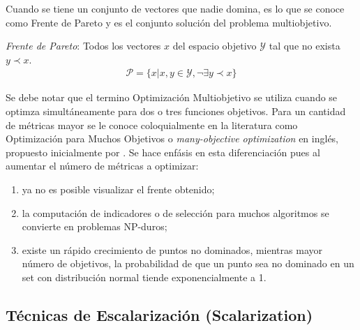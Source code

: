 Cuando se tiene un conjunto de vectores que nadie domina, es lo que se conoce como Frente de Pareto y es el conjunto soluci\'on del problema multiobjetivo.


\begin{definition}
    \textit{Frente de Pareto}: Todos los vectores $x$ del espacio objetivo $\mathcal{Y}$ tal que no exista $y \prec x$.
    \begin{align*}
        \mathcal{P} = \{x| x, y \in \mathcal{Y}, \neg \exists y \prec x \} 
    \end{align*}
\end{definition}

Se debe notar que el termino Optimizaci\'on Multiobjetivo se utiliza cuando se optimza simult\'aneamente para dos o tres funciones objetivos. Para un cantidad de m\'etricas mayor se le conoce coloquialmente en la literatura como Optimizaci\'on para Muchos Objetivos o \textit{many-objective optimization} en ingl\'es, propuesto inicialmente por \cite{10.1007/978-3-540-31880-4_2}. Se hace enf\'asis en esta  diferenciaci\'on pues al aumentar el n\'umero de m\'etricas a optimizar:
\begin{enumerate}
    \item ya no es posible visualizar el frente obtenido;
    \item la computaci\'on de indicadores o de selecci\'on para muchos algoritmos se convierte en problemas NP-duros;
    \item existe un r\'apido crecimiento de puntos no dominados, mientras mayor n\'umero de objetivos, la probabilidad de que un punto sea no dominado en un set con distribuci\'on normal tiende exponencialmente a 1.

\end{enumerate}


\subsection{T\'ecnicas de Escalarizaci\'on (Scalarization)}

